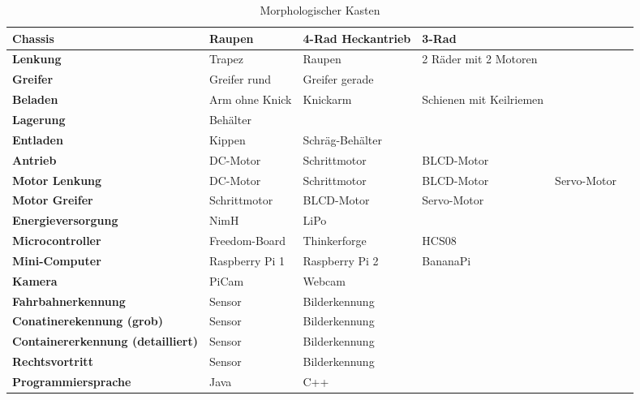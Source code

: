 \documentclass[a4paper, 10pt, fleqn]{article}
\begin{document}


\begin{table}[h]
\begin{tabular}{|m{}|M{0.15\textwidth}|M{0.15\textwidth}|M{0.15\textwidth}|M{0.15\textwidth}M{0.001\textwidth}|}
\hline

\textbf{Chassis} & Raupen & 4-Rad Heckantrieb & 3-Rad && \\[5ex]\hline 

\textbf{Lenkung} & Trapez & Raupen & 2 Räder mit 2 Motoren &&\\[5ex]\hline

\textbf{Greifer} & Greifer rund & Greifer gerade &&&\\[5ex]\hline

\textbf{Beladen} & Arm ohne Knick & Knickarm & Schienen mit Keilriemen&&\\[5ex]\hline

\textbf{Lagerung} & Behälter &&&&\\[5ex]\hline

\textbf{Entladen} & Kippen & Schräg-Behälter &&&\\[5ex]\hline

\textbf{Antrieb} & DC-Motor & Schrittmotor & BLCD-Motor &&\\[5ex]\hline

\textbf{Motor Lenkung} & DC-Motor & Schrittmotor & BLCD-Motor & Servo-Motor&\\[5ex]\hline

\textbf{Motor Greifer} & Schrittmotor & BLCD-Motor & Servo-Motor&&\\[5ex]\hline

\textbf{Energieversorgung} & NimH & LiPo&&&\\[5ex]\hline

\textbf{Microcontroller} & Freedom-Board & Thinkerforge & HCS08&&\\[5ex]\hline

\textbf{Mini-Computer} & Raspberry Pi 1 & Raspberry Pi 2 & BananaPi&&\\[5ex]\hline

\textbf{Kamera} & PiCam & Webcam&&&\\[5ex]\hline

\textbf{Fahrbahnerkennung} & Sensor & Bilderkennung &&&\\[5ex]\hline

\textbf{Conatinerekennung (grob)} & Sensor & Bilderkennung&&& \\[5ex]\hline

\textbf{Containererkennung (detailliert)} & Sensor & Bilderkennung&&&\\[5ex]\hline

\textbf{Rechtsvortritt} & Sensor & Bilderkennung&&&\\[5ex]\hline

\textbf{Programmiersprache} & Java & C++&&&\\[5ex]\hline



\end{tabular}\\
\caption{Morphologischer Kasten}
\end{table}
\end{document}
